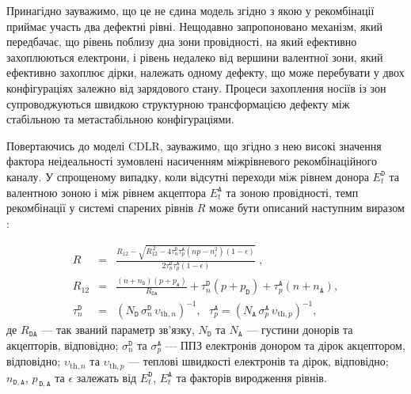 Принагідно зауважимо, що це не єдина модель згідно з якою у рекомбінації приймає участь два
дефектні рівні.
Нещодавно \cite{TwoLevelRecomb} запропоновано механізм, який передбачає, що рівень поблизу дна зони провідності,
на який ефективно захоплюються електрони, і рівень недалеко від вершини валентної зони, який ефективно захоплює дірки,
належать одному дефекту, що може перебувати у двох конфігураціях залежно від зарядового стану.
Процеси захоплення носіїв із зон супроводжуються швидкою структурною трансформацією дефекту
між стабільною та метастабільною конфігураціями.

Повертаючись до моделі CDLR,
зауважимо, що згідно з нею високі значення фактора неідеальності зумовлені насиченням
міжрівневого рекомбінаційного каналу.
%
У спрощеному випадку, коли відсутні переходи між рівнем донора $E_t^{\mathtt{D}}$ та валентною зоною
і між рівнем акцептора $E_t^{\mathtt{A}}$ та зоною провідності,
темп рекомбінації у системі спарених рівнів $R$ може бути описаний наступним виразом \cite{CDLR:JAP1995}:

\begin{eqnarray}
R&=&\frac{R_{12}-\sqrt{R_{12}^{\,2}-4\tau_{n}^{\mathtt{D}}\tau_{p}^{\mathtt{A}}(np-n_i^2)(1-\epsilon)}}{2\tau_{n}^{\mathtt{D}}\tau_{p}^{\mathtt{A}}(1-\epsilon)}\;,\label{eqR}\\
R_{12}&=&\frac{(n+n_{\mathtt{D}})(p+p_{\mathtt{A}})}{R_{\mathtt{DA}}}+
\tau_{n}^{\mathtt{D}}(p+p_{\mathtt{D}})+\tau_{p}^{\mathtt{A}}(n+n_{\mathtt{A}}),\label{eqR12}\\
\tau_{n}^{\mathtt{D}}&=&(N_{\mathtt{D}}\,\sigma_{n}^{\mathtt{D}}\,\upsilon_{\mathrm{th},n})^{-1},\,\,\,\,
\tau_{p}^{\mathtt{A}}=(N_{\mathtt{A}}\,\sigma_{p}^{\mathtt{A}}\,\upsilon_{\mathrm{th},p})^{-1},\label{eqTAU}
\end{eqnarray}
де
$R_{\mathtt{DA}}$ --- так званий параметр зв'язку,
$N_{\mathtt{D}}$ та $N_{\mathtt{A}}$ --- густини донорів та акцепторів, відповідно;
$\sigma_{n}^{\mathtt{D}}$ та $\sigma_{p}^{\mathtt{A}}$ --- ППЗ електронів донором та дірок акцептором, відповідно;
$\upsilon_{\mathrm{th},n}$ та $\upsilon_{\mathrm{th},p}$ --- теплові швидкості електронів та дірок, відповідно;
$n_{\mathtt{D,A}}$, $p_{\,\mathtt{D,A}}$ та $\epsilon$ залежать від $E_t^{\mathtt{D}}$, $E_t^{\mathtt{A}}$ та факторів виродження рівнів.

